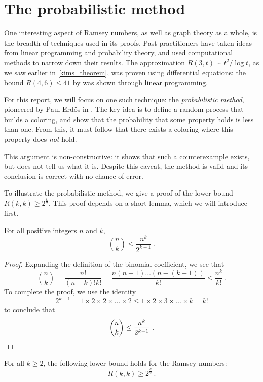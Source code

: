 \documentclass{article}
\begin{document}
\section{The probabilistic method}

One interesting aspect of Ramsey numbers, as well as graph theory as a whole, is the breadth of techniques used in its proofs. Past practitioners have taken ideas from linear programming and probability theory, and used computational methods to narrow down their results. The approximation $R(3,t) \sim t^2/\log t$, as we saw earlier in \cref{kims_theorem}, was proven using differential equations; the bound $R(4,6) \leq 41$ by \citet{mckay1997subgraph} was shown through linear programming.

For this report, we will focus on one such technique: the \textit{probabilistic method}, pioneered by Paul Erdős in \citeyear{erdos1947some}. The key idea is to define a random process that builds a coloring, and show that the probability that some property holds is less than one. From this, it must follow that there exists a coloring where this property does \emph{not} hold.

This argument is non-constructive: it shows that such a counterexample exists, but does not tell us what it is. Despite this caveat, the method is valid and its conclusion is correct with no chance of error.

To illustrate the probabilistic method, we give a proof of the lower bound $R(k,k) \geq 2^{\frac k 2}$. This proof depends on a short lemma, which we will introduce first.

\begin{Lemma} \label{binomial_bound}
    For all positive integers $n$ and $k$,
    \[ {n \choose k} \leq \frac{n^k}{2^{k-1}} \ . \]
\end{Lemma}

\begin{proof}
    Expanding the definition of the binomial coefficient, we see that
    \[
        {n \choose k}
        = \frac{n!}{(n-k)!k!}
        = \frac{n(n-1)\ldots(n-(k-1))}{k!}
        \leq \frac{n^k}{k!} \ .
    \]
    To complete the proof, we use the identity
    \[
        2^{k-1}
        = 1 \times 2 \times 2 \times \ldots \times 2
        \leq 1 \times 2 \times 3 \times \ldots \times k
        = k!
    \]
    to conclude that
    \[
        {n \choose k} \leq \frac{n^k}{2^{k-1}} \ . \qedhere
    \]
\end{proof}

\begin{Theorem}
    For all $k \geq 2$, the following lower bound holds for the Ramsey numbers:
    \[ R(k,k) \geq 2^{\frac k 2} \ . \]
\end{Theorem}
\end{document}
